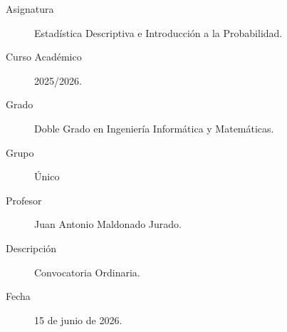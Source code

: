\documentclass[12pt]{article}
\begin{document}

    
    

    \begin{description}
        \item[Asignatura] Estadística Descriptiva e Introducción a la Probabilidad.
        \item[Curso Académico] 2025/2026.
        \item[Grado] Doble Grado en Ingeniería Informática y Matemáticas.
        \item[Grupo] Único
        \item[Profesor] Juan Antonio Maldonado Jurado.
        \item[Descripción] Convocatoria Ordinaria.
        \item[Fecha] 15 de junio de 2026.
    
    \end{description}
    \newpage


    
\end{document}
